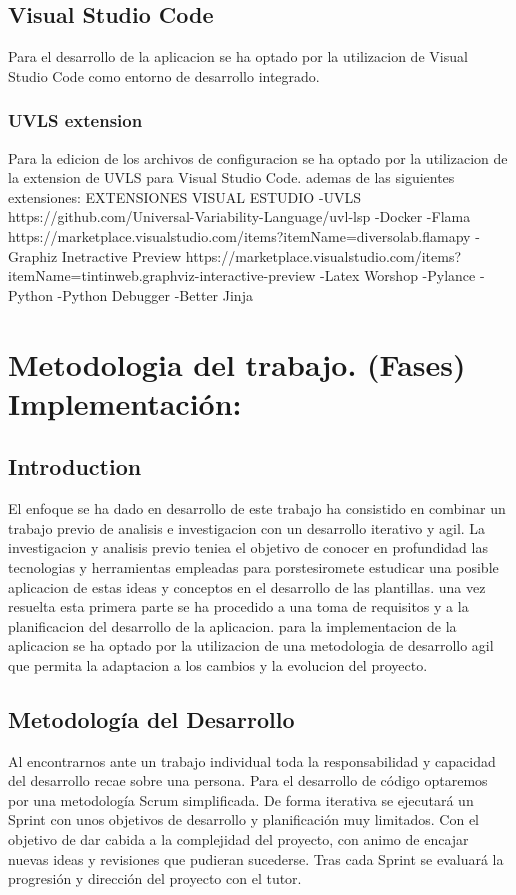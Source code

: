 \documentclass[12pt, a4paper, twoside]{article}
\begin{document}
\subsection{Visual Studio Code}
Para el desarrollo de la aplicacion se ha optado por la utilizacion de Visual Studio Code como entorno de desarrollo integrado.
\subsubsection{UVLS extension}
Para la edicion de los archivos de configuracion se ha optado por la utilizacion de la extension de UVLS para Visual Studio Code.
ademas de las siguientes extensiones:
EXTENSIONES VISUAL ESTUDIO
	-UVLS https://github.com/Universal-Variability-Language/uvl-lsp
	-Docker
	-Flama https://marketplace.visualstudio.com/items?itemName=diversolab.flamapy
	-Graphiz Inetractive Preview https://marketplace.visualstudio.com/items?itemName=tintinweb.graphviz-interactive-preview
	-Latex Worshop
	-Pylance
	-Python
	-Python Debugger
	-Better Jinja






\section{Metodologia del trabajo. (Fases) Implementación:}
\subsection{Introduction}
El enfoque se ha dado en desarrollo de este trabajo ha consistido en combinar un trabajo previo de analisis e investigacion con un desarrollo iterativo y agil.
La investigacion y analisis previo teniea el objetivo de conocer en profundidad las tecnologias y herramientas empleadas
para porstesiromete estudicar una posible aplicacion de estas ideas y conceptos en el desarrollo de las plantillas.
una vez resuelta esta primera parte se ha procedido a una toma de requisitos y a la planificacion del desarrollo de la aplicacion.
para la implementacion de la aplicacion se ha optado por la utilizacion de una metodologia de desarrollo agil que permita la adaptacion a los cambios y la evolucion del proyecto.
\subsection{Metodología del Desarrollo}
Al encontrarnos ante un trabajo individual toda la responsabilidad y capacidad del desarrollo recae sobre una persona. 
Para el desarrollo de código optaremos por una metodología Scrum simplificada. De forma iterativa se ejecutará un Sprint con 
unos objetivos de desarrollo y planificación muy limitados. Con el objetivo de dar cabida a la complejidad del proyecto, 
con animo de encajar nuevas ideas y revisiones que pudieran sucederse.
Tras cada Sprint se evaluará la progresión y dirección del proyecto con el tutor. 
\end{document}
